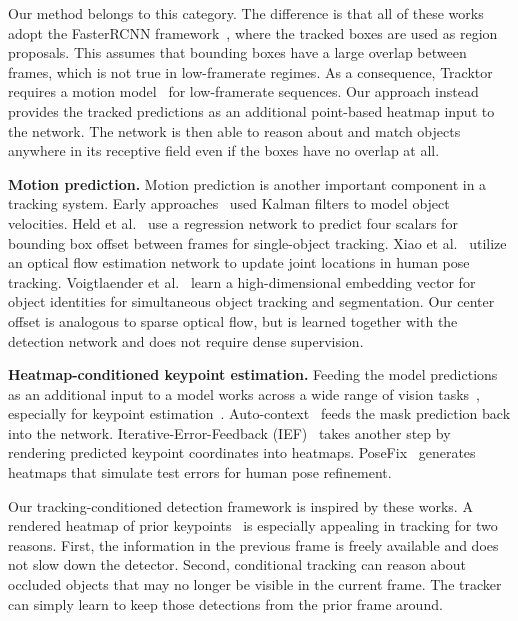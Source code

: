 \documentclass[runningheads]{llncs}
\renewcommand{\paragraph}[1]{\noindent\textbf{#1}}
\begin{document}
Our method belongs to this category. The difference is that all of these works adopt the FasterRCNN framework~\cite{ren2015faster}, where the tracked boxes are used as region proposals.
This assumes that bounding boxes have a large overlap between frames, which is not true in low-framerate regimes.
As a consequence, Tracktor~\cite{bergmann2019tracking} requires a motion model~\cite{evangelidis2008parametric,choi2010multiple} for low-framerate sequences. 
Our approach instead provides the tracked predictions as an additional point-based heatmap input to the network.
The network is then able to reason about and match objects anywhere in its receptive field even if the boxes 
have no overlap at all.

\paragraph{Motion prediction.}
Motion prediction is another important component in a tracking system.
Early approaches~\cite{Bewley2016_sort,Wojke2017simple} used Kalman filters to model object velocities.
Held et al.~\cite{held2016learning} use a regression network to predict four scalars for bounding box offset between frames for single-object tracking.
Xiao et al.~\cite{xiao2018simple} utilize an optical flow estimation network to update joint locations in human pose tracking.
Voigtlaender et al.~\cite{voigtlaender2019mots} learn a high-dimensional embedding vector for object identities for simultaneous object tracking and segmentation.
Our center offset is analogous to sparse optical flow, but is learned together with the detection network and does not require dense supervision.


\paragraph{Heatmap-conditioned keypoint estimation.}
Feeding the model predictions as an additional input to a model works across a wide range of vision tasks~\cite{tu2008auto}, especially for keypoint estimation~\cite{carreira2016human,fieraru2018learning,Moon_2019_CVPR_PoseFix}. 
Auto-context~\cite{tu2008auto} feeds the mask prediction back into the network.
Iterative-Error-Feedback (IEF)~\cite{carreira2016human} takes another step by rendering predicted keypoint coordinates into heatmaps.
PoseFix~\cite{Moon_2019_CVPR_PoseFix} generates heatmaps that simulate test errors for human pose refinement.

Our tracking-conditioned detection framework is inspired by these works.
A rendered heatmap of prior keypoints~\cite{tu2008auto,carreira2016human,fieraru2018learning,Moon_2019_CVPR_PoseFix} is especially appealing in tracking for two reasons. First, the information in the previous frame is freely available and does not slow down the detector.
Second, conditional tracking can reason about occluded objects that may no longer be visible in the current frame. The tracker can simply learn to keep those detections from the prior frame around.
\end{document}
